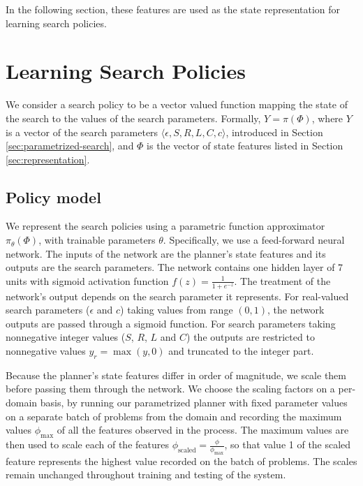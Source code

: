 \documentclass[letterpaper]{article} %
\begin{document}
In the following section, these features are used as the state representation for learning search policies.

\section{Learning Search Policies}

We consider a search policy to be a vector valued function mapping the state of the search to the values of the search parameters. Formally, $Y=\pi(\Phi)$, where $Y$ is a vector of the search parameters $\langle \epsilon, S, R, L, C, c\rangle$, introduced in Section \ref{sec:parametrized-search}, and $\Phi$ is the vector of state features listed in Section \ref{sec:representation}.

\subsection{Policy model}

We represent the search policies using a parametric function approximator $\pi_{\theta}(\Phi)$, with trainable parameters $\theta$.
Specifically, we use a feed-forward neural network. The inputs of the network are the planner's state features and its outputs are the search parameters. The network contains one hidden layer of 7 units with sigmoid activation function $f(z)=\frac{1}{1+e^{-z}}$. The treatment of the network's output depends on the search parameter it represents. For real-valued search parameters ($\epsilon$ and $c$) taking values from range $(0,1)$, the network outputs are passed through a sigmoid function. For search parameters taking nonnegative integer values ($S$, $R$, $L$ and $C$) the outputs are restricted to nonnegative values $y_r=\operatorname{max}(y,0)$ and truncated to the integer part.

Because the planner's state features differ in order of magnitude, we scale them before passing them through the network. We choose the scaling factors on a per-domain basis, by running our parametrized planner with fixed parameter values on a separate batch of problems from the domain and recording the maximum values $\phi_{\mathrm{max}}$ of all the features observed in the process. The maximum values are then used to scale each of the features $\phi_{\mathrm{scaled}}=\frac{\phi}{\phi_{\mathrm{max}}}$, so that value 1 of the scaled feature represents the highest value recorded on the batch of problems. The scales remain unchanged throughout training and testing of the system.
\end{document}
